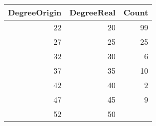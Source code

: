 \begin{tabular}{rrr}
\toprule
 DegreeOrigin &  DegreeReal &  Count \\
\midrule
           22 &          20 &     99 \\
           27 &          25 &     25 \\
           32 &          30 &      6 \\
           37 &          35 &     10 \\
           42 &          40 &      2 \\
           47 &          45 &      9 \\
           52 &          50 &   \color{red}{8956} \\
\bottomrule
\end{tabular}
